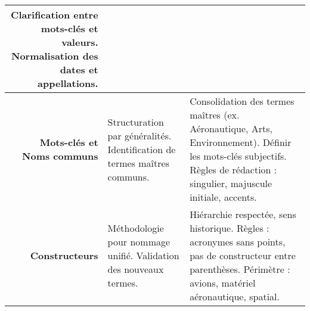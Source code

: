 \begin{longtable}{D E E}
	Clarification entre mots-clés et valeurs. \newline
	Normalisation des dates et appellations. \\
	\hline
	\textbf{Mots-clés et Noms communs} &
	Structuration par généralités. \newline
	Identification de termes maîtres communs. &
	Consolidation des termes maîtres (ex. Aéronautique, Arts, Environnement). \newline
	Définir les mots-clés subjectifs. \newline
	Règles de rédaction : singulier, majuscule initiale, accents. \\
	\hline
	\textbf{Constructeurs} &
	Méthodologie pour nommage unifié. \newline
	Validation des nouveaux termes. &
	Hiérarchie respectée, sens historique. \newline
	Règles : acronymes sans points, pas de constructeur entre parenthèses. \newline
	Périmètre : avions, matériel aéronautique, spatial. \\
\end{longtable}